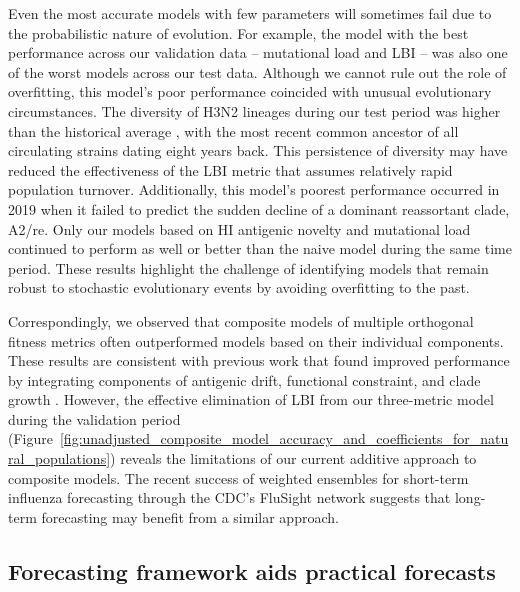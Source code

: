 Even the most accurate models with few parameters will sometimes fail due to the probabilistic nature of evolution.
For example, the model with the best performance across our validation data -- mutational load and LBI -- was also one of the worst models across our test data.
Although we cannot rule out the role of overfitting, this model's poor performance coincided with unusual evolutionary circumstances.
The diversity of H3N2 lineages during our test period was higher than the historical average \citep{Koelle:2006kf}, with the most recent common ancestor of all circulating strains dating eight years back.
This persistence of diversity may have reduced the effectiveness of the LBI metric that assumes relatively rapid population turnover.
Additionally, this model's poorest performance occurred in 2019 when it failed to predict the sudden decline of a dominant reassortant clade, A2/re.
Only our models based on HI antigenic novelty and mutational load continued to perform as well or better than the naive model during the same time period.
These results highlight the challenge of identifying models that remain robust to stochastic evolutionary events by avoiding overfitting to the past.

Correspondingly, we observed that composite models of multiple orthogonal fitness metrics often outperformed models based on their individual components.
These results are consistent with previous work that found improved performance by integrating components of antigenic drift, functional constraint, and clade growth \citep{Luksza:2014hj}.
However, the effective elimination of LBI from our three-metric model during the validation period (Figure~\ref{fig:unadjusted_composite_model_accuracy_and_coefficients_for_natural_populations}) reveals the limitations of our current additive approach to composite models.
The recent success of weighted ensembles for short-term influenza forecasting through the CDC's FluSight network \citep{Reich:2019bq} suggests that long-term forecasting may benefit from a similar approach.

\subsection*{Forecasting framework aids practical forecasts}

